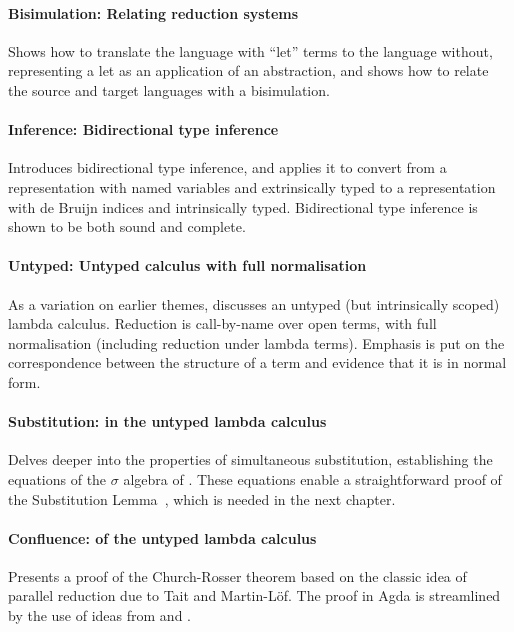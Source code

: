 \documentclass[preprint,authoryear]{elsarticle}
\begin{document}
\paragraph{Bisimulation: Relating reduction systems}
Shows how to translate the language with ``let'' terms
to the language without, representing a let as an application of an abstraction,
and shows how to relate the source and target languages with a bisimulation.

\paragraph{Inference: Bidirectional type inference}
Introduces bidirectional type inference, and applies it to convert from
a representation with named variables and extrinsically typed
to a representation with de Bruijn indices and intrinsically typed. Bidirectional
type inference is shown to be both sound and complete.

\paragraph{Untyped: Untyped calculus with full normalisation}
As a variation on earlier themes, discusses an untyped (but intrinsically
scoped) lambda calculus.  Reduction is call-by-name over open terms,
with full normalisation (including reduction under lambda terms).  Emphasis
is put on the correspondence between the structure of a term and
evidence that it is in normal form.

\paragraph{Substitution: in the untyped lambda calculus}
Delves deeper into the properties of simultaneous substitution,
establishing the equations of the $\sigma$ algebra of
\citet{Abadi-1991}. These equations enable a straightforward proof of
the Substitution Lemma~\citep{Barendregt-1984}, which is needed in the
next chapter.

\paragraph{Confluence: of the untyped lambda calculus}
Presents a proof of the Church-Rosser theorem based on the classic
idea of parallel reduction due to Tait and Martin-L\"of. The proof in
Agda is streamlined by the use of ideas from
\citet{Schafer-Tebbi-Smolka-2015} and \citet{Pfenning-1992}.
\end{document}
